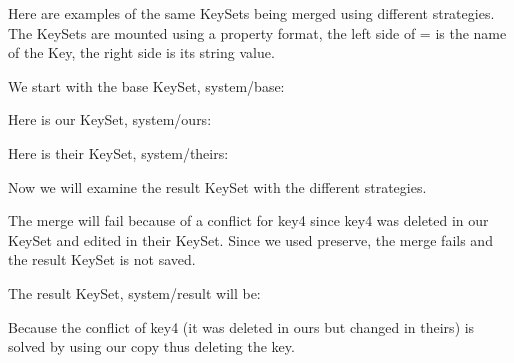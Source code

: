 Here are examples of the same Key\+Sets being merged using different strategies. The Key\+Sets are mounted using a property format, the left side of \textquotesingle{}=\textquotesingle{} is the name of the Key, the right side is its string value.

We start with the base Key\+Set, {\ttfamily system/base}\+:


\begin{DoxyCode}{0}
\end{DoxyCode}


Here is our Key\+Set, {\ttfamily system/ours}\+:


\begin{DoxyCode}{0}
\end{DoxyCode}


Here is their Key\+Set, {\ttfamily system/theirs}\+:


\begin{DoxyCode}{0}
\end{DoxyCode}


Now we will examine the result Key\+Set with the different strategies.


\begin{DoxyCode}{0}
\end{DoxyCode}


The merge will fail because of a conflict for {\ttfamily key4} since {\ttfamily key4} was deleted in our Key\+Set and edited in their Key\+Set. Since we used preserve, the merge fails and the result Key\+Set is not saved.


\begin{DoxyCode}{0}
\end{DoxyCode}


The result Key\+Set, system/result will be\+:


\begin{DoxyCode}{0}
\end{DoxyCode}


Because the conflict of {\ttfamily key4} (it was deleted in {\ttfamily ours} but changed in {\ttfamily theirs}) is solved by using our copy thus deleting the key.


